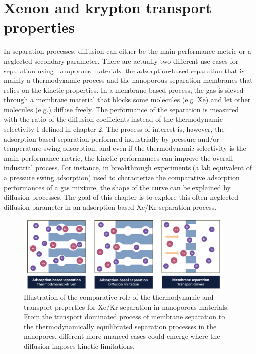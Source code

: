 \documentclass[main]{subfiles}
\begin{document}
\chapter{Xenon and krypton transport properties}
\vspace*{-1\baselineskip}


In separation processes, diffusion can either be the main performance metric or a neglected secondary parameter. There are actually two different use cases for separation using nanoporous materials: the adsorption-based separation that is mainly a thermodynamic process and the nanoporous separation membranes that relies on the kinetic properties. In a membrane-based process, the gas is sieved through a membrane material that blocks some molecules (e.g. Xe) and let other molecules (e.g.) diffuse freely. The performance of the separation is measured with the ratio of the diffusion coefficients instead of the thermodynamic selectivity I defined in chapter 2. The process of interest is, however, the adsorption-based separation performed industrially by pressure and/or temperature swing adsorption, and even if the thermodynamic selectivity is the main performance metric, the kinetic performances can improve the overall industrial process.\autocite{Kumar_1994} For instance, in breakthrough experiments (a lab equivalent of a pressure swing adsorption) used to characterize the comparative adsorption performances of a gas mixture, the shape of the curve can be explained by diffusion processes. The goal of this chapter is to explore this often neglected diffusion parameter in an adsorption-based Xe/Kr separation process.

\begin{figure}[ht]
  \centering
    \includegraphics[width=0.95\textwidth]{figures/5-diffusion/Diffusion.pdf}
    \caption{Illustration of the comparative role of the thermodynamic and transport properties for Xe/Kr separation in nanoporous materials. From the transport dominated process of membrane separation to the thermodynamically equilibrated separation processes in the nanopores, different more nuanced cases could emerge where the diffusion imposes kinetic limitations.}\label{fgr:intro_diffusion}
\end{figure}
\end{document}
